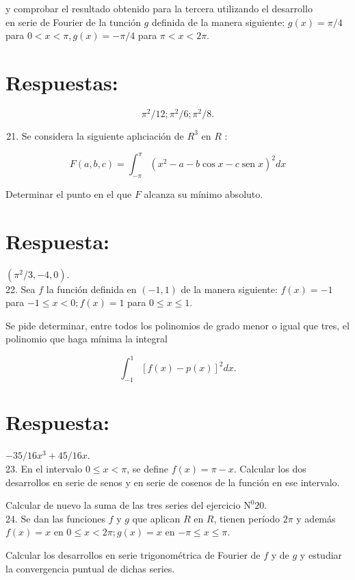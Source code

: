 \documentclass[10pt]{article}
\theoremstyle{plain}
\theoremstyle{definition}
\theoremstyle{remark}
\begin{document}
y comprobar el resultado obtenido para la tercera utilizando el desarrollo\\
en serie de Fourier de la tunción $g$ definida de la manera siguiente: $g(x)=\pi / 4$ para $0<x<\pi, g(x)=-\pi / 4$ para $\pi<x<2 \pi$.

\section*{Respuestas:}
$$
\pi^{2} / 12 ; \pi^{2} / 6 ; \pi^{2} / 8 .
$$

\begin{enumerate}
  \setcounter{enumi}{20}
  \item Se considera la siguiente aplıciación de $R^{3}$ en $R$ :
\end{enumerate}

$$
F(a, b, c)=\int_{-\pi}^{\pi}\left(x^{2}-a-b \cos x-c \operatorname{sen} x\right)^{2} d x
$$

Determinar el punto en el que $F$ alcanza su mínimo absoluto.

\section*{Respuesta:}
$\left(\pi^{2} / 3,-4,0\right)$.\\
22. Sea $f$ la función definida en $(-1,1)$ de la manera siguiente: $f(x)=-1$ para $-1 \leqslant x<0 ; f(x)=1$ para $0 \leqslant x \leqslant 1$.

Se pide determinar, entre todos los polinomios de grado menor o igual que tres, el polinomio que haga mínima la integral

$$
\int_{-1}^{1}[f(x)-p(x)]^{2} d x .
$$

\section*{Respuesta:}
$-35 / 16 x^{3}+45 / 16 x$.\\
23. En el intervalo $0 \leqslant x<\pi$, se define $f(x)=\pi-x$. Calcular los dos desarrollos en serie de senos y en serie de cosenos de la función en ese intervalo.

Calcular de nuevo la suma de las tres series del ejercicio $\mathrm{N}^{0} 20$.\\
24. Se dan las funciones $f$ y $g$ que aplican $R$ en $R$, tienen período $2 \pi$ y además $f(x)=x$ en $0 \leqslant x<2 \pi ; g(x)=x$ en $-\pi \leqslant x \leqslant \pi$.

Calcular los desarrollos en serie trigonométrica de Fourier de $f$ y de $g$ y estudiar la convergencia puntual de dichas series.
\end{document}
